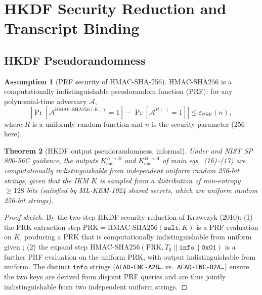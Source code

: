 \documentclass[12pt,letterpaper]{article}
\theoremstyle{plain}
\newtheorem{theorem}{Theorem}[section]
\theoremstyle{definition}
\newtheorem{assumption}[theorem]{Assumption}
\newcommand{\HMAC}{\mathrm{HMAC\text{-}SHA256}}
\newcommand{\eps}{\varepsilon}
\begin{document}
\section{HKDF Security Reduction and Transcript Binding}
\label{app:hkdf}

\subsection{HKDF Pseudorandomness}

\begin{assumption}[PRF security of HMAC-SHA-256]
\label{ass:prf}
\(\HMAC\) is a computationally indistinguishable pseudorandom
function (PRF): for any polynomial-time adversary \(\mathcal{A}\),
\[
  \left|
    \Pr[\mathcal{A}^{\HMAC(K,\cdot)} = 1]
    - \Pr[\mathcal{A}^{R(\cdot)} = 1]
  \right| \leq \eps_{\mathrm{PRF}}(n),
\]
where \(R\) is a uniformly random function and \(n\) is the security
parameter (256 here).
\end{assumption}

\begin{theorem}[HKDF output pseudorandomness, informal]
\label{thm:hkdf_prf}
Under  and NIST SP 800-56C guidance,
the outputs \(K_{\mathrm{enc}}^{A\to B}\) and \(K_{\mathrm{enc}}^{B\to A}\)
of main eqs.~(16)--(17) are computationally indistinguishable from
independent uniform random 256-bit strings, given that the IKM \(K\)
is sampled from a distribution of min-entropy
\(\geq 128\) bits (satisfied by ML-KEM-1024 shared secrets, which are
uniform random 256-bit strings).
\end{theorem}
\begin{proof}[Proof sketch]
By the two-step HKDF security reduction of Krawczyk (2010):
(1) the PRK extraction step \(\mathrm{PRK} = \HMAC(\mathtt{salt}, K)\)
is a PRF evaluation on \(K\), producing a PRK that is computationally
indistinguishable from uniform given ;
(2) the expand step \(\HMAC(\mathrm{PRK}, T_0 \| \mathtt{info} \| \mathtt{0x01})\)
is a further PRF evaluation on the uniform PRK, with output
indistinguishable from uniform.  The distinct \(\mathtt{info}\) strings
(\texttt{AEAD-ENC-A2B\ldots} vs.\ \texttt{AEAD-ENC-B2A\ldots}) ensure
the two keys are derived from disjoint PRF queries and are thus
jointly indistinguishable from two independent uniform strings.
\end{proof}
\end{document}

